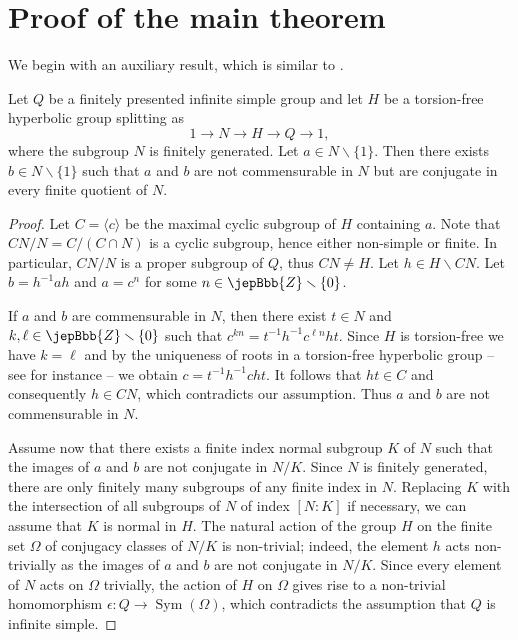 \section{Proof of the main theorem}
We begin with an auxiliary result, which is similar to \cite[Prop.\,4.2]{ref14}.

\begin{lemma}\label{lem:finiteconjugacy}
Let $Q$ be a finitely presented infinite simple group and let $H$ be a torsion-free hyperbolic group splitting as
\[
1\longrightarrow N\longrightarrow H\longrightarrow Q\longrightarrow1,
\]
where the subgroup $N$ is finitely generated. Let $a\in N\smallsetminus\{1\}$. Then there exists $b\in N\smallsetminus\{1\}$ such that $a$ and $b$ are not commensurable in $N$ but are conjugate in every finite quotient of $N$.
\end{lemma}
\begin{proof}
Let $C=\langle c\rangle$ be the maximal cyclic subgroup of $H$ containing $a$. Note that $CN/N=C/(C\cap N)$ is a cyclic subgroup, hence either non-simple or finite. In particular, $CN/N$ is a proper subgroup of $Q$, thus $CN\neq H$. Let $h\in H\smallsetminus CN$. Let $b=h^{-1}ah$ and $a=c^n$ for some $n\in\jepBbb{Z}\smallsetminus\{0\}$.

If $a$ and $b$ are commensurable in $N$, then there exist $t\in N$ and $k,\ell\in\jepBbb{Z}\smallsetminus\{0\}$ such that $c^{kn}=t^{-1}h^{-1}c^{\ell n}ht$. Since $H$ is torsion-free we have $k=\ell$ and by the uniqueness of roots in a torsion-free hyperbolic group -- see for instance \cite[Cor.\,7.2]{ref04} -- we obtain $c=t^{-1}h^{-1}cht$. It follows that $ht\in C$ and consequently $h\in CN$, which contradicts our assumption. Thus $a$ and $b$ are not commensurable in $N$.

Assume now that there exists a finite index normal subgroup $K$ of $N$ such that the images of $a$ and $b$ are not conjugate in $N/K$. Since $N$ is finitely generated, there are only finitely many subgroups of any finite index in $N$. Replacing $K$ with the intersection of all subgroups of $N$ of index $[N:K]$ if necessary, we can assume that $K$ is normal in $H$. The natural action of the group $H$ on the finite set $\Omega$ of conjugacy classes of $N/K$ is non-trivial; indeed, the element $h$ acts non-trivially as the images of $a$ and $b$ are not conjugate in $N/K$. Since every element of $N$ acts on $\Omega$ trivially, the action of $H$ on $\Omega$ gives rise to a non-trivial homomorphism $\epsilon:Q\to\operatorname{Sym}(\Omega)$, which contradicts the assumption that $Q$ is infinite simple.
\end{proof}

